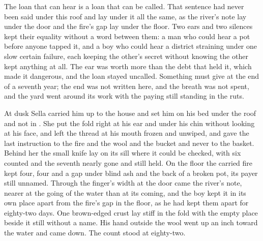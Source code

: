 The loan that can hear is a loan that can be called. That sentence had never been said under this roof and lay under it all the same, as the river's note lay under the door and the fire's gap lay under the floor. Two ears and two silences kept their equality without a word between them: a man who could hear a pot before anyone tapped it, and a boy who could hear a district straining under one slow certain failure, each keeping the other's secret without knowing the other kept anything at all. The ear was worth more than the debt that held it, which made it dangerous, and the loan stayed uncalled. Something must give at the end of a seventh year; the end was not written here, and the breath was not spent, and the yard went around its work with the paying still standing in the ruts.

At dusk Sella carried him up to the house and set him on his bed under the roof and not in . She put the fold right at his ear and under his chin without looking at his face, and left the thread at his mouth frozen and unwiped, and gave the last instruction to the fire and the wool and the bucket and never to the basket. Behind her the small knife lay on its sill where it could be checked, with six counted and the seventh nearly gone and still held. On the floor the carried fire kept four, four and a gap under blind ash and the back of a broken pot, its payer still unnamed. Through the finger's width at the door came the river's note, nearer at the going of the water than at its coming, and the boy kept it in its own place apart from the fire's gap in the floor, as he had kept them apart for eighty-two days. One brown-edged crust lay stiff in the fold with the empty place beside it still without a name. His hand outside the wool went up an inch toward the water and came down. The count stood at eighty-two.
